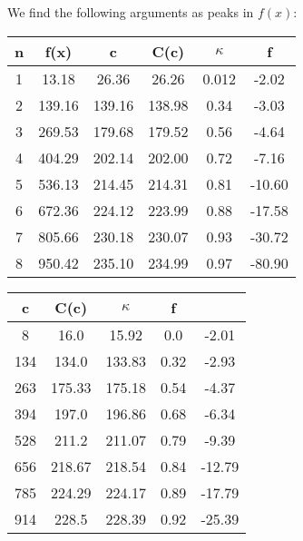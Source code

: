 \documentclass[../main.tex]{subfiles}
\begin{document}
        
        
        We find the following arguments as peaks in $f(x)$:
        \begin{table}[H]
            \centering
            \begin{tabular}{c|c|c|c|c|c}
                n & f(x)    & c       & C(c)    & $\kappa$ & f\\
                \hline
                1 & 13.18   & 26.36   & 26.26   & 0.012 & -2.02 \\
                2 & 139.16  & 139.16  & 138.98  & 0.34  & -3.03  \\
                3 & 269.53  & 179.68  & 179.52  & 0.56  & -4.64  \\
                4 & 404.29  & 202.14  & 202.00  & 0.72  & -7.16  \\
                5 & 536.13  & 214.45  & 214.31  & 0.81  & -10.60 \\
                6 & 672.36  & 224.12  & 223.99  & 0.88  & -17.58 \\
                7 & 805.66  & 230.18  & 230.07  & 0.93  & -30.72 \\
                8 & 950.42  & 235.10  & 234.99  & 0.97  & -80.90
            \end{tabular}
        \end{table}

        \begin{table}[H]
            \centering
            \begin{tabular}{ccccc}
                c & C(c) & $\kappa$ & f\\
                \hline
                8 & 16.0 & 15.92 & 0.0 & -2.01	\\
                134 & 134.0 & 133.83 & 0.32 & -2.93	\\
                263 & 175.33 & 175.18 & 0.54 & -4.37	\\
                394 & 197.0 & 196.86 & 0.68 & -6.34	\\
                528 & 211.2 & 211.07 & 0.79 & -9.39	\\
                656 & 218.67 & 218.54 & 0.84 & -12.79	\\
                785 & 224.29 & 224.17 & 0.89 & -17.79	\\
                914 & 228.5 & 228.39 & 0.92 & -25.39	\\
            \end{tabular}
        \end{table}

        
\end{document}
